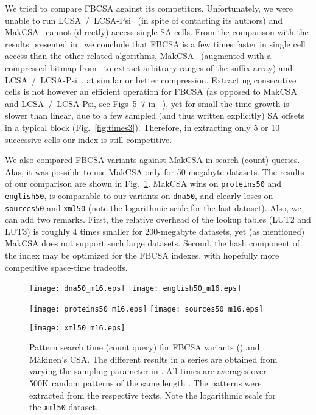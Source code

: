 \documentclass{cai}
\begin{document}
We tried to compare FBCSA against its competitors. 
Unfortunately, we were unable to run LCSA~/~LCSA-Psi~\cite{GNFjea14}
(in spite of contacting its authors) 
and MakCSA~\cite{DBLP:journals/fuin/Makinen03} cannot (directly) 
access single SA cells.
From the comparison with the results presented in~\cite[Sect.~4]{GNFjea14} 
we conclude that FBCSA is a few times faster in single cell access 
than the other related algorithms, MakCSA~\cite{DBLP:journals/fuin/Makinen03} 
(augmented with a compressed bitmap from~\cite{RamanRR02} to extract arbitrary 
ranges of the suffix array) and LCSA~/~LCSA-Psi~\cite{GNFjea14}, 
at similar or better compression.
Extracting  consecutive cells is not however an efficient operation for FBCSA 
(as opposed to MakCSA and LCSA~/~LCSA-Psi, see Figs~5--7 in ~\cite{GNFjea14}), 
yet for small  the time growth is slower than linear, due to a few sampled 
(and thus written explicitly) SA offsets in a typical block (Fig.~\ref{fig:times3}).
Therefore, in extracting only 5 or 10 successive cells our index is still 
competitive.



We also compared FBCSA variants against MakCSA in search (count) queries.
Alas, it was possible to use MakCSA only for 50-megabyte datasets.
The results of our comparison are shown in Fig.~\ref{fig:fb_mak}.
MakCSA wins on \texttt{proteins50} and \texttt{english50}, 
is comparable to our variants on \texttt{dna50}, and 
clearly loses on \texttt{sources50} and \texttt{xml50} 
(note the logarithmic scale for the last dataset).
Also, we can add two remarks.
First, the relative overhead of the lookup tables (LUT2 and LUT3) is roughly 
4 times smaller for 200-megabyte datasets, yet (as mentioned) 
MakCSA does not support such large datasets.
Second, the hash component of the index may be optimized for the FBCSA indexes, 
with hopefully more competitive space-time tradeoffs.


\begin{figure}
\centerline{
\texttt{[image: dna50\_m16.eps]}
\texttt{[image: english50\_m16.eps]}
}
\centerline{
\texttt{[image: proteins50\_m16.eps]}
\texttt{[image: sources50\_m16.eps]}
}
\centerline{
\texttt{[image: xml50\_m16.eps]}
}
\caption[Results]
{Pattern search time (count query) for FBCSA variants () and 
M{\"a}kinen's CSA.
The different results in a series are obtained from varying the sampling 
parameter  in .
All times are averages over 500K random patterns of the same length 
.
The patterns were extracted from the respective texts.
Note the logarithmic scale for the \texttt{xml50} dataset.}
\label{fig:fb_mak}
\end{figure}
\end{document}
